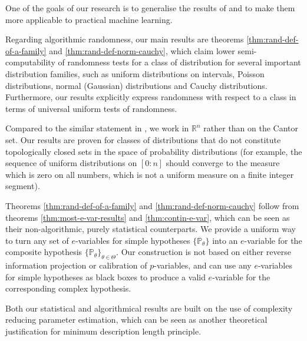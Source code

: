\documentclass{article}
\theoremstyle{definition}
\theoremstyle{definition}
\newcommand{\reals}{\mathbb{R}}
\newcommand{\probP}{\mathbb{P}}
\begin{document}
One of the goals of our research is to generalise the results of \cite{vovk2016concept} and \cite{Bienvenu2011AlgorithmicTA} to make them more applicable to practical machine learning.

Regarding algorithmic randomness, our main results are theorems \ref{thm:rand-def-of-a-family} and \ref{thm:rand-def-norm-cauchy}, which claim lower semi-computability of randomness tests for a class of distribution for several important distribution families, such as uniform distributions on intervals, Poisson distributions, normal (Gaussian) distributions and Cauchy distributions. Furthermore, our results explicitly express randomness with respect to a class in terms of universal uniform tests of randomness.

Compared to the similar statement in \cite{Bienvenu2011AlgorithmicTA}, we work in $\reals^n$ rather than on the Cantor set. Our results are proven for classes of distributions that do not constitute topologically closed sets in the space of probability distributions (for example, the sequence of uniform distributions on $[0:n]$ should converge to the measure which is zero on all numbers, which is not a uniform measure on a finite integer segment).


Theorems \ref{thm:rand-def-of-a-family} and \ref{thm:rand-def-norm-cauchy} follow from theorems \ref{thm:most-e-var-results} and \ref{thm:contin-e-var}, which can be seen as their non-algorithmic, purely statistical counterparts. We provide a uniform way to turn any set of $e$-variables for simple hypotheses $\{\probP_\theta\}$ into an $e$-variable for the composite hypothesis $\{\probP_\theta\}_{\theta\in\Theta}$. Our construction is not based on either reverse information projection or calibration of $p$-variables, and can use any $e$-variables for simple hypotheses as black boxes to produce a valid $e$-variable for the corresponding complex hypothesis.

Both our statistical and algorithmical results are built on the use of complexity reducing parameter estimation, which can be seen as another theoretical justification for minimum description length principle. 



\end{document}
